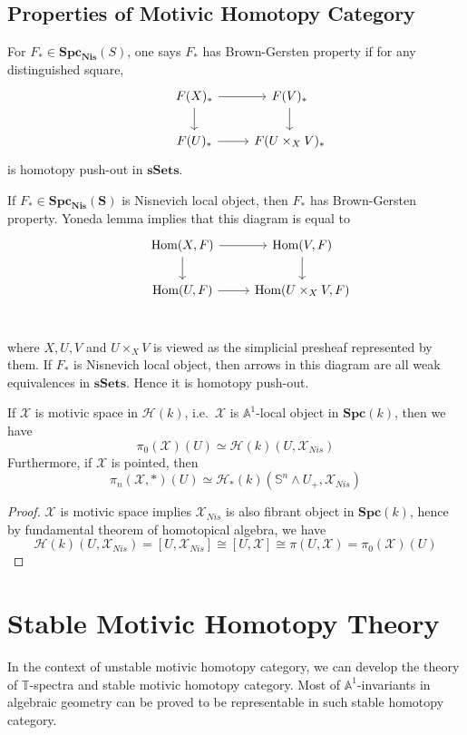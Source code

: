 \documentclass[b5paper,10pt]{article}
\begin{document}
\subsection{Properties of Motivic Homotopy Category}
\begin{secdefn}
	For $F_* \in \mathbf{Spc_{Nis}}(S)$, one says $F_*$ has Brown-Gersten property if for any distinguished square,
	\[
	\begin{tikzcd}
	&F(X)_* \ar[r] \ar[d] & F(V)_* \ar[d]\\
	&F(U)_* \ar[r]& F(U \times_X V)_*
	\end{tikzcd}
	\]
	is homotopy push-out in $\mathbf{sSets}$.
\end{secdefn}
If $F_* \in \mathbf{Spc_{Nis}(S)}$ is Nisnevich local object, then $F_*$ has Brown-Gersten property. Yoneda lemma implies that this diagram is equal to 
\[
\begin{tikzcd}
&\hom(X,F) \ar[r] \ar[d]& \hom(V,F) \ar[d]\\
&\hom(U,F) \ar[r]&\hom(U\times_X V,F)\\ 
\end{tikzcd}
\]

where $X, U,V$ and $U \times_X V$ is viewed as the simplicial presheaf represented by them. If $F_*$ is Nisnevich local object, then arrows in this diagram are all weak equivalences in $\mathbf{sSets}$. Hence it is homotopy push-out.
\begin{secprop}
	If $\mathcal{X}$ is motivic space in $\mathcal{H}(k)$, i.e.\ $\mathcal{X}$ is $\mathbb{A}^1$-local object in $\mathbf{Spc}(k)$, then we have
	\[
	\pi_0(\mathcal{X})(U) \simeq \mathcal{H}(k)(U, \mathcal{X}_{Nis}) 
	\]
	Furthermore, if $\mathcal{X}$ is pointed, then
	\[
	\pi_n(\mathcal{X},*)(U) \simeq \mathcal{H}_*(k)(\mathbb{S}^n \wedge U_+,\mathcal{X}_{Nis})
	\]
\end{secprop}
\begin{proof}
	$\mathcal{X}$ is motivic space implies $\mathcal{X}_{Nis}$ is also fibrant object in $\mathbf{Spc}(k)$, hence by fundamental theorem of homotopical algebra, we have 
	\[
	\mathcal{H}(k)(U, \mathcal{X}_{Nis}) = [U,\mathcal{X}_{Nis}] \cong [U,\mathcal{X}]\cong \pi(U,\mathcal{X}) = \pi_0(\mathcal{X})(U)
	\]
\end{proof}
\section{Stable Motivic Homotopy Theory}
In the context of unstable motivic homotopy category, we can develop the theory of $\mathbb{T}$-spectra and stable motivic homotopy category. Most of $\mathbb{A}^1$-invariants in algebraic geometry can be proved to be representable in such stable homotopy category.
\end{document}
